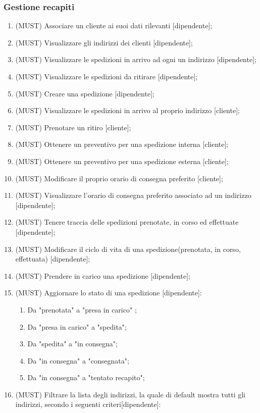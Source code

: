 \clearpage
\subsubsection{Gestione recapiti}
\begin{enumerate}
  \item{(MUST)} Associare un cliente ai suoi dati rilevanti [dipendente];
  \item{(MUST)} Visualizzare gli indirizzi dei clienti [dipendente];
  \item{(MUST)} Visualizzare le spedizioni in arrivo ad ogni un indirizzo [dipendente];
  \item{(MUST)} Visualizzare le spedizioni da ritirare [dipendente];
  \item{(MUST)} Creare una spedizione [dipendente];
  \item{(MUST)} Visualizzare le spedizioni in arrivo al proprio indirizzo [cliente];
  \item{(MUST)} Prenotare un ritiro [cliente];
  \item{(MUST)} Ottenere un preventivo per una spedizione interna [cliente];
  \item{(MUST)} Ottenere un preventivo per una spedizione esterna [cliente];
  \item{(MUST)} Modificare il proprio orario di consegna preferito [cliente];
  \item{(MUST)} Visualizzare l'orario di consegna preferito associato ad un indirizzo [dipendente];
  \item{(MUST)} Tenere traccia delle spedizioni prenotate, in corso ed effettuate [dipendente];
  \item{(MUST)} Modificare il ciclo di vita di una spedizione(prenotata, in corso, effettuata) [dipendente];
  \item{(MUST)} Prendere in carico una spedizione [dipendente];
  \item{(MUST)} Aggiornare lo stato di una spedizione [dipendente]:
    \begin{enumerate}
      \item{Da "prenotata" a "presa in carico" };
      \item{Da "presa in carico" a "spedita"};
      \item{Da "spedita" a "in consegna"};
      \item{Da "in consegna" a "consegnata"};
      \item{Da "in consegna" a "tentato recapito"};
    \end{enumerate}
  \item{(MUST)} Filtrare la lista degli indirizzi, la quale di default mostra tutti gli indirizzi, secondo i seguenti criteri[dipendente]:

\end{enumerate}
